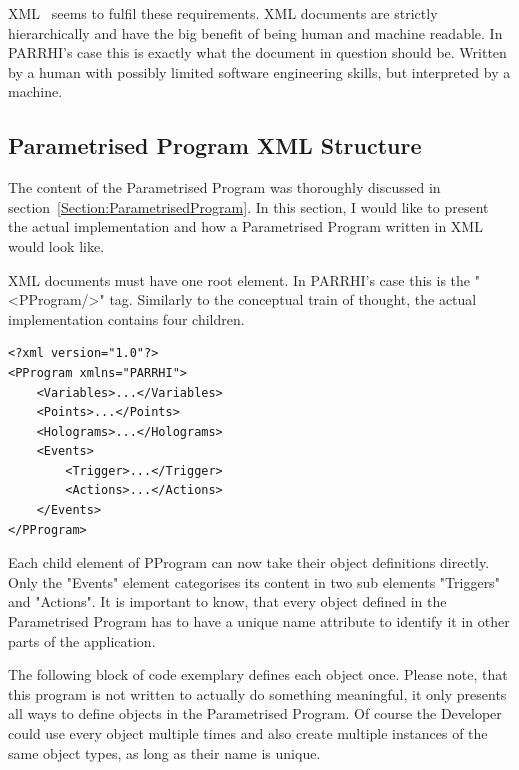 XML~\cite{xmlW3C} seems to fulfil these requirements. XML documents are strictly hierarchically and have the big benefit of being human and machine readable. In PARRHI's case this is exactly what the document in question should be. Written by a human with possibly limited software engineering skills, but interpreted by a machine.


\subsection{Parametrised Program XML Structure}
The content of the Parametrised Program was thoroughly discussed in section~\ref{Section:ParametrisedProgram}. In this section, I would like to present the actual implementation and how a Parametrised Program written in XML would look like.

XML documents must have one root element. In PARRHI's case this is the "<PProgram/>" tag. Similarly to the conceptual train of thought, the actual implementation contains four children.

\begin{lstlisting}
<?xml version="1.0"?>
<PProgram xmlns="PARRHI">
	<Variables>...</Variables>
	<Points>...</Points>
	<Holograms>...</Holograms>
	<Events>
		<Trigger>...</Trigger>
		<Actions>...</Actions>
	</Events>
</PProgram>
\end{lstlisting}

Each child element of PProgram can now take their object definitions directly. Only the "Events" element categorises its content in two sub elements "Triggers" and "Actions". It is important to know, that every object defined in the Parametrised Program has to have a unique name attribute to identify it in other parts of the application. 

The following block of code exemplary defines each object once. Please note, that this program is not written to actually do something meaningful, it only presents all ways to define objects in the Parametrised Program. Of course the Developer could use every object multiple times and also create multiple instances of the same object types, as long as their name is unique.

